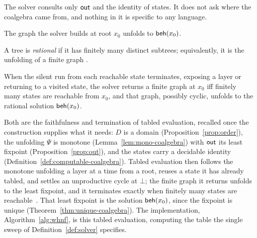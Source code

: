 The solver consults only $\mathsf{out}$ and the identity of states. It does not ask where the coalgebra came from, and nothing in it is specific to any language.

\begin{theorem}[Soundness]\label{thm:correctness}
  The graph the solver builds at root $x_0$ unfolds to $\mathsf{beh}(x_0)$.
\end{theorem}

\begin{definition}[Rational]\label{def:rational}
  A tree is \emph{rational} if it has finitely many distinct subtrees; equivalently, it is the unfolding of a finite graph \cite{courcelle1983-infinite-trees}.
\end{definition}

\begin{theorem}[Termination]\label{thm:termination}
  When the silent run from each reachable state terminates, exposing a layer or returning to a visited state, the solver returns a finite graph at $x_0$ iff finitely many states are reachable from $x_0$, and that graph, possibly cyclic, unfolds to the rational solution $\mathsf{beh}(x_0)$.
\end{theorem}

\noindent Both are the faithfulness and termination of tabled evaluation, recalled once the construction supplies what it needs: $D$ is a domain (Proposition~\ref{prop:order}), the unfolding $\Psi$ is monotone (Lemma~\ref{lem:mono-coalgebra}) with $\mathsf{out}$ its least fixpoint (Proposition~\ref{prop:out}), and the states carry a decidable identity (Definition~\ref{def:computable-coalgebra}). Tabled evaluation then follows the monotone unfolding a layer at a time from a root, reuses a state it has already tabled, and settles an unproductive cycle at $\bot$; the finite graph it returns unfolds to the least fixpoint, and it terminates exactly when finitely many states are reachable~\cite{vanemden-kowalski, tamaki-sato, tabling-slg}. That least fixpoint is the solution $\mathsf{beh}(x_0)$, since the fixpoint is unique (Theorem~\ref{thm:unique-coalgebra}). The implementation, Algorithm~\ref{alg:whnf}, is this tabled evaluation, computing the table the single sweep of Definition~\ref{def:solver} specifies.

